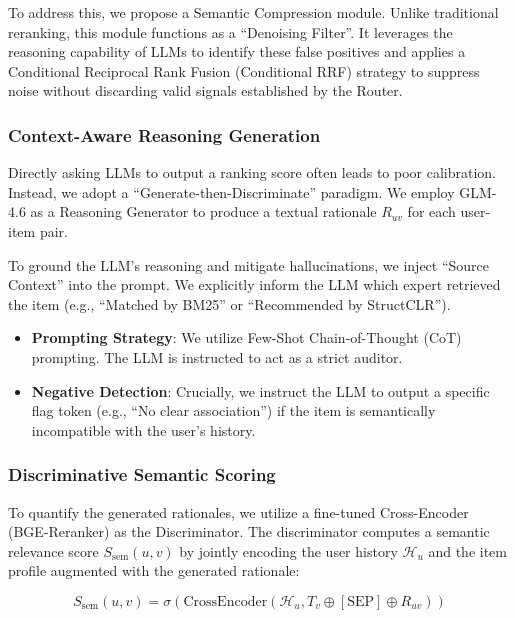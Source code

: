 To address this, we propose a Semantic Compression module. Unlike traditional reranking, this module functions as a ``Denoising Filter''. It leverages the reasoning capability of LLMs to identify these false positives and applies a Conditional Reciprocal Rank Fusion (Conditional RRF) strategy to suppress noise without discarding valid signals established by the Router.

\subsubsection{Context-Aware Reasoning Generation}

Directly asking LLMs to output a ranking score often leads to poor calibration. Instead, we adopt a ``Generate-then-Discriminate'' paradigm. We employ GLM-4.6 as a Reasoning Generator to produce a textual rationale $R_{uv}$ for each user-item pair.

To ground the LLM's reasoning and mitigate hallucinations, we inject ``Source Context'' into the prompt. We explicitly inform the LLM which expert retrieved the item (e.g., ``Matched by BM25'' or ``Recommended by StructCLR'').

\begin{itemize}
    \item \textbf{Prompting Strategy}: We utilize Few-Shot Chain-of-Thought (CoT) prompting. The LLM is instructed to act as a strict auditor.
    \item \textbf{Negative Detection}: Crucially, we instruct the LLM to output a specific flag token (e.g., ``No clear association'') if the item is semantically incompatible with the user's history.
\end{itemize}

\subsubsection{Discriminative Semantic Scoring}

To quantify the generated rationales, we utilize a fine-tuned Cross-Encoder (BGE-Reranker) as the Discriminator. The discriminator computes a semantic relevance score $S_{\mathrm{sem}}\left( u,v \right)$ by jointly encoding the user history $\mathcal{H}_{u}$ and the item profile augmented with the generated rationale:

\begin{equation}
S_{\mathrm{sem}}\left( u,v \right) = \sigma\left( \mathrm{CrossEncoder}\left( \mathcal{H}_{u},T_{v} \oplus \left[ \mathrm{SEP} \right] \oplus R_{uv} \right) \right)
\end{equation}

